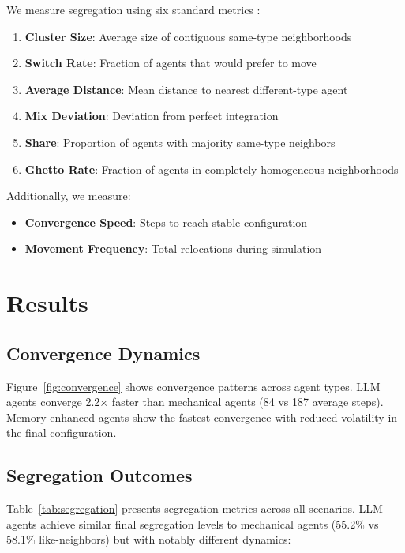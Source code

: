 \documentclass[pdflatex,sn-basic]{sn-jnl}%
\theoremstyle{thmstyleone}%
\theoremstyle{thmstyletwo}%
\theoremstyle{thmstylethree}%
\begin{document}
We measure segregation using six standard metrics \cite{Massey1988}:

\begin{enumerate}
\item \textbf{Cluster Size}: Average size of contiguous same-type neighborhoods
\item \textbf{Switch Rate}: Fraction of agents that would prefer to move
\item \textbf{Average Distance}: Mean distance to nearest different-type agent
\item \textbf{Mix Deviation}: Deviation from perfect integration
\item \textbf{Share}: Proportion of agents with majority same-type neighbors
\item \textbf{Ghetto Rate}: Fraction of agents in completely homogeneous neighborhoods
\end{enumerate}

Additionally, we measure:
\begin{itemize}
\item \textbf{Convergence Speed}: Steps to reach stable configuration
\item \textbf{Movement Frequency}: Total relocations during simulation
\end{itemize}

\section{Results}\label{sec:results}

\subsection{Convergence Dynamics}

Figure~\ref{fig:convergence} shows convergence patterns across agent types. LLM agents converge 2.2× faster than mechanical agents (84 vs 187 average steps). Memory-enhanced agents show the fastest convergence with reduced volatility in the final configuration.

\subsection{Segregation Outcomes}

Table~\ref{tab:segregation} presents segregation metrics across all scenarios. LLM agents achieve similar final segregation levels to mechanical agents (55.2\% vs 58.1\% like-neighbors) but with notably different dynamics:
\end{document}
